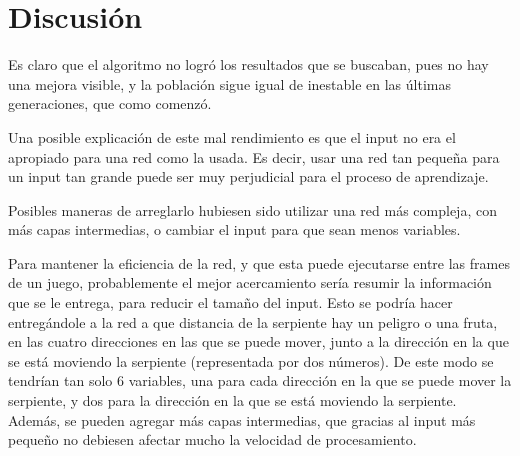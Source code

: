 \documentclass[letterpaper,11pt]{article} %
\begin{document}
\section{Discusión}
  Es claro que el algoritmo no logró los resultados que se buscaban, pues no hay una mejora visible, y la población sigue igual de inestable en las últimas generaciones, que como comenzó.

  Una posible explicación de este mal rendimiento es que el input no era el apropiado para una red como la usada. Es decir, usar una red tan pequeña para un input tan grande puede ser muy perjudicial para el proceso de aprendizaje. 
  
  Posibles maneras de arreglarlo hubiesen sido utilizar una red más compleja, con más capas intermedias, o cambiar el input para que sean menos variables. 
  
  Para mantener la eficiencia de la red, y que esta puede ejecutarse entre las frames de un juego, probablemente el mejor acercamiento sería resumir la información que se le entrega, para reducir el tamaño del input. Esto se podría hacer entregándole a la red a que distancia de la serpiente hay un peligro o una fruta, en las cuatro direcciones en las que se puede mover, junto a la dirección en la que se está moviendo la serpiente (representada por dos números). De este modo se tendrían tan solo 6 variables, una para cada dirección en la que se puede mover la serpiente, y dos para la dirección en la que se está moviendo la serpiente. Además, se pueden agregar más capas intermedias, que gracias al input más pequeño no debiesen afectar mucho la velocidad de procesamiento.

\end{document}
